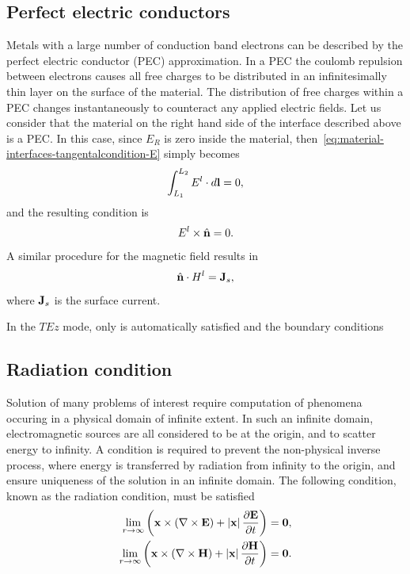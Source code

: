 \subsection{Perfect electric conductors}
Metals with a large number of conduction band electrons can be described by the
perfect electric conductor (PEC) approximation. In a PEC the coulomb repulsion
between electrons causes all free charges to be distributed in an
infinitesimally thin layer on the surface of the material. The distribution of
free charges within a PEC changes instantaneously to counteract any applied
electric fields. Let us consider that the material on the right hand side of the
interface described above is a PEC. In this case, since $E_R$ is zero inside the
material, then~\eqref{eq:material-interfaces-tangentalcondition-E} simply
becomes
\begin{equation*}
\int_{L_1}^{L_2} E^l \cdot d\mathbf{l} = 0 ,
\end{equation*}
and the resulting condition is
\begin{equation}
E^l \times \hat{\mathbf{n}} = 0 .
\label{eq:material-interfaces-tangentalcondition-E-PEC}
\end{equation}
A similar procedure for the magnetic field results in
\begin{equation}
\hat{\mathbf{n}} \cdot H^l = \mathbf{J}_s ,
\label{eq:material-interfaces-tangentalcondition-H-PEC}
\end{equation}
where $\mathbf{J}_s$ is the surface current.

In the $TEz$ mode, only is automatically satisfied and the
boundary conditions

\subsection{Radiation condition}
Solution of many problems of interest require computation of phenomena occuring
in a physical domain of infinite extent. In such an infinite domain, electromagnetic
sources are all considered to be at the origin, and to scatter energy to infinity.
A condition is required to prevent the non-physical inverse process, where energy
is transferred by radiation from infinity to the origin, and ensure uniqueness of
the solution in an infinite domain. The following condition,
known as the \SilverMuller radiation condition, must be satisfied
\begin{align}
  \lim_{ r \to \infty } \left( \mathbf{x} \times \left( \nabla \times \mathbf{E} \right) + \left| \mathbf{x} \right| \frac{\partial \mathbf{E}}{\partial t} \right) = \mathbf{0}, \\
  \lim_{ r \to \infty } \left( \mathbf{x} \times \left( \nabla \times \mathbf{H} \right) + \left| \mathbf{x} \right| \frac{\partial \mathbf{H}}{\partial t} \right) = \mathbf{0}.
\end{align}


